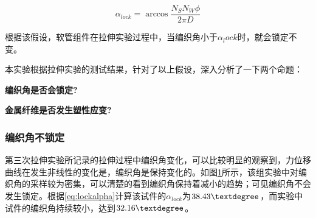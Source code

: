 \begin{equation}
\label{eq:lockalpha}
{\alpha _{lock}} = \arccos \frac{{{N_S}{N_W}\phi }}{{2\pi D}}
\end{equation}

根据该假设，软管组件在拉伸实验过程中，当编织角小于$ \alpha_lock $时，就会锁定不变。

本实验根据拉伸实验的测试结果，针对了以上假设，深入分析了一下两个命题：
\begin{compactitem}
	\item \textbf{编织角是否会锁定?}
	\item \textbf{金属纤维是否发生塑性应变?}
\end{compactitem}





\subsubsection{编织角不锁定}

第三次拉伸实验所记录的拉伸过程中编织角变化，可以比较明显的观察到，力位移曲线在发生非线性的变化是，编织角是保持变化的。如图\ref{fig:angle-conclusion}所示，该组实验中对编织角的采样较为密集，可以清楚的看到编织角保持着减小的趋势；可见编织角不会发生锁定。根据\ref{eq:lockalpha}计算该试件的$ \alpha_{lock} $为$ 38.43\textdegree $，而实验中试件的编织角持续较小，达到$ 32.16\textdegree $。

\begin{figure}[!htb]
	\centering
	\label{fig:angle-conclusion}
\end{figure}

